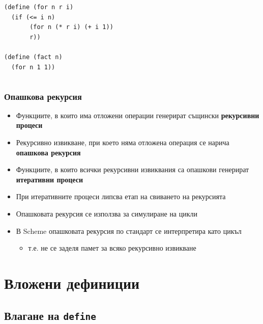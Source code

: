 \documentclass{beamer}
\begin{document}
\begin{frame}
\begin{columns}[t,onlytextwidth]
    \scriptsize

\tt{(define (for \alert<3> n r i)}\\
\verb#  #\tt{(if (<= i n)}\\
\verb#       #\tt{(for \alert<3> n (* r i) (+ i 1))}\\
\verb#       #\tt{r))}\\
\ \\
\tt{(define (fact n)}\\
\verb#  #\tt{(for \alert<3> n 1 1))}

  \end{columns}
\end{frame}

\begin{frame}
  \frametitle{Опашкова рекурсия}

  \begin{itemize}[<+->]
  \item Функциите, в които има отложени операции генерират същински \textbf{рекурсивни процеси}
  \item Рекурсивно извикване, при което няма отложена операция се нарича \textbf{опашкова рекурсия}
  \item Функциите, в които всички рекурсивни извиквания са опашкови генерират \textbf{итеративни процеси}
  \item При итеративните процеси липсва етап на свиването на рекурсията
  \item Опашковата рекурсия се използва за симулиране на цикли
  \item В Scheme опашковата рекурсия \alert{по стандарт} се интерпретира като цикъл
    \begin{itemize}
    \item т.е. не се заделя памет за всяко рекурсивно извикване
    \end{itemize}
  \end{itemize}
\end{frame}

\section{Вложени дефиниции}



\subsection{Влагане на \tt{define}}
\end{document}
